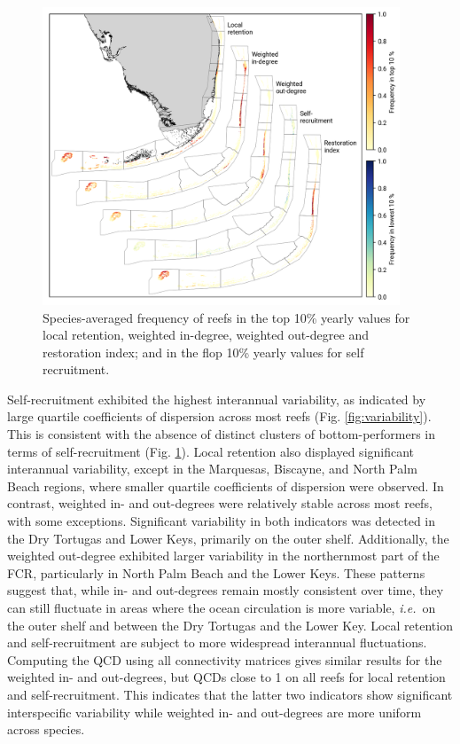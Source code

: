 \documentclass[preprint,12pt,authoryear]{elsarticle}
\newcommand{\ie}{{\it i.e.}\ }
\begin{document}
\begin{figure}
   \centering
   \includegraphics[width=0.95\textwidth]{figures/fig_top10.png}
   \caption{Species-averaged frequency of reefs in the top 10\% yearly values for local retention, weighted in-degree, weighted out-degree and restoration index; and in the flop 10\% yearly values for self recruitment.
    }\label{fig:top10}
\end{figure}

Self-recruitment exhibited the highest interannual variability, as indicated by large quartile coefficients of dispersion across most reefs (Fig. \ref{fig:variability}). This is consistent with the absence of distinct clusters of bottom-performers in terms of self-recruitment (Fig. \ref{fig:top10}). Local retention also displayed significant interannual variability, except in the Marquesas, Biscayne, and North Palm Beach regions, where smaller quartile coefficients of dispersion were observed. In contrast, weighted in- and out-degrees were relatively stable across most reefs, with some exceptions. Significant variability in both indicators was detected in the Dry Tortugas and Lower Keys, primarily on the outer shelf. Additionally, the weighted out-degree exhibited larger variability in the northernmost part of the FCR, particularly in North Palm Beach and the Lower Keys. These patterns suggest that, while in- and out-degrees remain mostly consistent over time, they can still fluctuate in areas where the ocean circulation is more variable, \ie on the outer shelf and between the Dry Tortugas and the Lower Key. Local retention and self-recruitment are subject to more widespread interannual fluctuations. Computing the QCD using all connectivity matrices gives similar results for the weighted in- and out-degrees, but QCDs close to 1 on all reefs for local retention and self-recruitment. This indicates that the latter two indicators show significant interspecific variability while weighted in- and out-degrees are more uniform across species.
\end{document}
